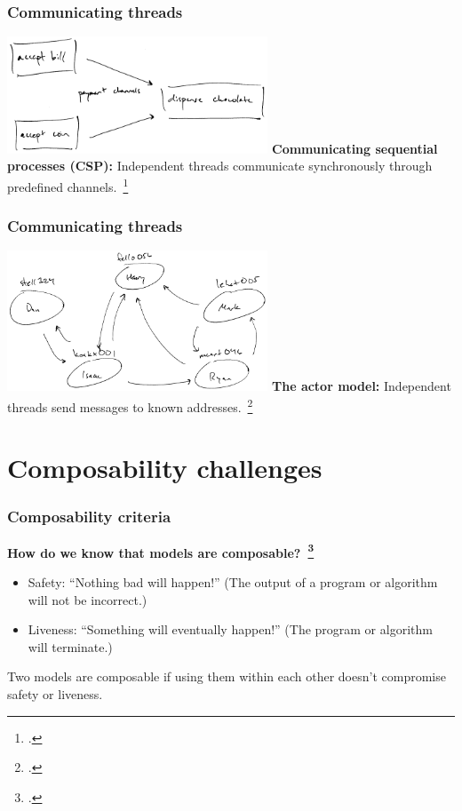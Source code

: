 \documentclass[aspectratio=1610]{beamer}
\begin{document}
  \begin{frame}
    \frametitle{Communicating threads}
    \centering

    \includegraphics[width=220pt]{../figures/csp}
    \vfill
    \textbf{Communicating sequential processes (CSP):} Independent threads communicate synchronously through predefined channels.~\footcite{Hoare1978}
  \end{frame}

  \begin{frame}
    \frametitle{Communicating threads}
    \centering

    \includegraphics[width=220pt]{../figures/actor}
    \vfill
    \textbf{The actor model:} Independent threads send messages to known addresses.~\footcite{Agha1986}
  \end{frame}

  \section{Composability challenges}

  \begin{frame}
    \frametitle{Composability criteria}

    \textbf{How do we know that models are composable?~\footcite{Swalens2014}}

    \begin{itemize}
      \item Safety: ``Nothing bad will happen!'' (The output of a program or algorithm will not be incorrect.)
      \item Liveness: ``Something will eventually happen!'' (The program or algorithm will terminate.)
    \end{itemize}

    Two models are composable if using them within each other doesn't compromise safety or liveness.
  \end{frame}
\end{document}
